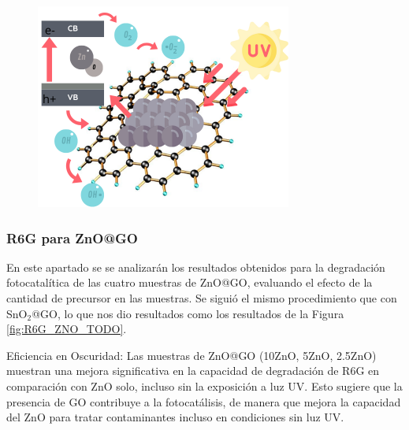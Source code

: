\documentclass[12pt]{article}
\begin{document}
\begin{figure}[H]
    	   \begin{center}
     	  	\includegraphics[width = 0.75\textwidth]{Imagenes/ZnO_Fotocatalisis.png}
    	   \end{center} 
        \end{figure}

\subsubsection{R6G para ZnO@GO}
En este apartado se  se analizarán los resultados obtenidos para la degradación fotocatalítica de las cuatro muestras de ZnO@GO, evaluando el efecto de la cantidad de precursor en las muestras. Se siguió el mismo procedimiento que con SnO$\displaystyle _{2}$@GO, lo que nos dio resultados como los resultados de la Figura \ref{fig:R6G_ZNO_TODO}. \vspace{1em} %

Eficiencia en Oscuridad:
Las muestras de ZnO@GO (10ZnO, 5ZnO, 2.5ZnO) muestran una mejora significativa en la capacidad de degradación de R6G en comparación con ZnO solo, incluso sin la exposición a luz UV. Esto sugiere que la presencia de GO contribuye a la fotocatálisis, de manera que mejora la capacidad del ZnO para tratar contaminantes incluso en condiciones sin luz UV.\vspace{1em} %
\end{document}
